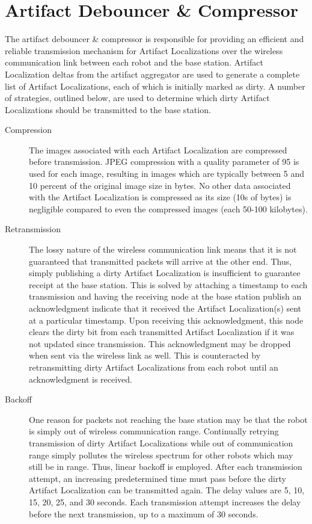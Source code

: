 \section{Artifact Debouncer \& Compressor}

The artifact debouncer \& compressor is responsible for providing an efficient and reliable transmission mechanism for Artifact Localizations over the wireless communication link between each robot and the base station. Artifact Localization deltas from the artifact aggregator are used to generate a complete list of Artifact Localizations, each of which is initially marked as dirty. A number of strategies, outlined below, are used to determine which dirty Artifact Localizations should be transmitted to the base station.

\begin{description}
	\item[Compression] The images associated with each Artifact Localization are compressed before transmission. JPEG compression with a quality parameter of 95 is used for each image, resulting in images which are typically between 5 and 10 percent of the original image size in bytes. No other data associated with the Artifact Localization is compressed as its size (10s of bytes) is negligible compared to even the compressed images (each 50-100 kilobytes).
	
	\item[Retransmission] The lossy nature of the wireless communication link means that it is not guaranteed that transmitted packets will arrive at the other end. Thus, simply publishing a dirty Artifact Localization is insufficient to guarantee receipt at the base station. This is solved by attaching a timestamp to each transmission and having the receiving node at the base station publish an acknowledgment indicate that it received the Artifact Localization(s) sent at a particular timestamp. Upon receiving this acknowledgment, this node clears the dirty bit from each transmitted Artifact Localization if it was not updated since transmission. This acknowledgment may be dropped when sent via the wireless link as well. This is counteracted by retransmitting dirty Artifact Localizations from each robot until an acknowledgment is received.
	
	\item[Backoff] One reason for packets not reaching the base station may be that the robot is simply out of wireless communication range. Continually retrying transmission of dirty Artifact Localizations while out of communication range simply pollutes the wireless spectrum for other robots which may still be in range. Thus, linear backoff is employed. After each transmission attempt, an increasing predetermined time must pass before the dirty Artifact Localization can be transmitted again. The delay values are 5, 10, 15, 20, 25, and 30 seconds. Each transmission attempt increases the delay before the next transmission, up to a maximum of 30 seconds.
	

\end{description}
